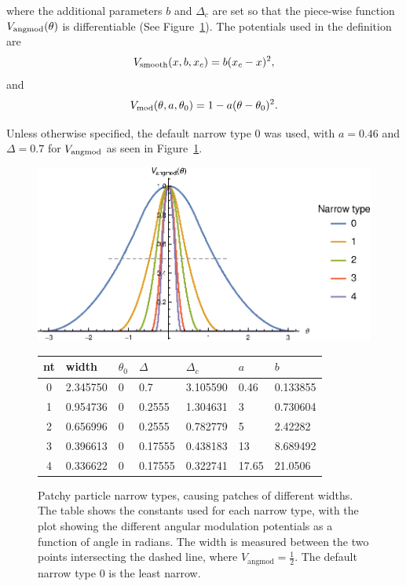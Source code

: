 where the additional parameters $b$ and $\Delta_c$ are set so that the piece-wise function $V_{\rm angmod}(\theta)$ is differentiable (See Figure~\ref{fig:narrow_types}). The potentials used in the definition are 
\begin{equation}
\label{eq:smooth}
V_{\rm smooth} (x, b, x_c) = b(x_c - x)^2, 
\end{equation}
and
\begin{equation}
V_{\rm mod} (\theta, a, \theta_0) = 1 - a (\theta-\theta_0)^2.
\end{equation}

Unless otherwise specified, the default narrow type 0 was used, with 
$a = 0.46$ and $\Delta = 0.7$ for $V_{\rm angmod}$ as seen in Figure~\ref{fig:narrow_types}.

\begin{figure}[h]
\includegraphics[width=\linewidth]{figures/patchysim/nts.eps}
\begin{tabular}{|c|l||l|l|l|l|l|}
    \hline
    nt & width & \(\theta_0\) & \(\Delta\) & \(\Delta_c\) & \(a\) & \(b\) \\ [0.5ex] 
    \hline\hline
    0 & 2.345750 & 0 & 0.7 & 3.105590 & 0.46 & 0.133855 \\
    1 & 0.954736 & 0 & 0.2555 & 1.304631 & 3 & 0.730604 \\
    2 & 0.656996 & 0 & 0.2555 & 0.782779 & 5 & 2.42282 \\
    3 & 0.396613 & 0 & 0.17555 & 0.438183 & 13 & 8.689492 \\
    4 & 0.336622 & 0 & 0.17555 & 0.322741 & 17.65 & 21.0506 \\
    \hline
\end{tabular}
\caption{Patchy particle narrow types, causing patches of different widths. The table shows the constants used for each narrow type, with the plot showing the different angular modulation potentials as a function of angle in radians. The width is measured between the two points intersecting the dashed line, where \(V_{\text{angmod}}=\frac{1}{2}\). The default narrow type \(0\) is the least narrow. }
\label{fig:narrow_types}
\end{figure}

